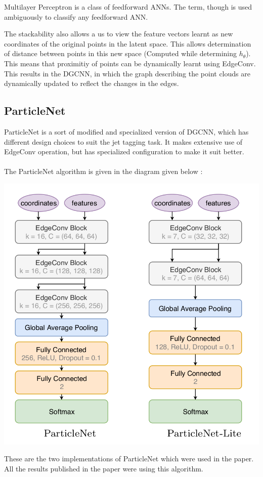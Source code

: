 \begin{note}
    Multilayer Perceptron is a class of feedforward ANNs. The term, though is used ambiguously to classify any feedforward ANN.
\end{note}

\noindent The stackability also allows a us to view the feature vectors learnt as new coordinates of the original points in the latent space. This allows determination of distance between points in this new space (Computed while  determining $h_\theta$). This means that proximitiy of points can be dynamically  learnt using EdgeConv. This results in the DGCNN, in which the graph describing  the point clouds are dynamically updated to reflect the changes in the edges.

\subsection{ParticleNet}
ParticleNet is a sort of modified and specialized version of DGCNN, which has different design choices to suit the jet tagging task. It makes extensive use of EdgeConv operation, but has specialized configuration to make it suit better.

\paragraph{} The ParticleNet algorithm is given in the diagram given below :

\begin{center}
    \includegraphics[scale=0.25]{img/theory-ml-particlenet/particle-net.png}
\end{center}

\noindent These are the two implementations of ParticleNet which were used in the paper. All the results published in the paper were using this algorithm.